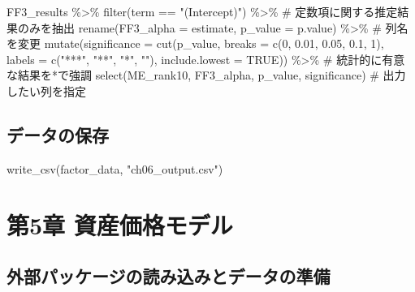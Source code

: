 \documentclass[
  letterpaper,
  DIV=11,
  numbers=noendperiod]{scrreprt}
\newenvironment{Shaded}{\begin{snugshade}}{\end{snugshade}}
\newcommand{\AttributeTok}[1]{\textcolor[rgb]{0.40,0.45,0.13}{#1}}
\newcommand{\CommentTok}[1]{\textcolor[rgb]{0.37,0.37,0.37}{#1}}
\newcommand{\ConstantTok}[1]{\textcolor[rgb]{0.56,0.35,0.01}{#1}}
\newcommand{\DecValTok}[1]{\textcolor[rgb]{0.68,0.00,0.00}{#1}}
\newcommand{\FloatTok}[1]{\textcolor[rgb]{0.68,0.00,0.00}{#1}}
\newcommand{\FunctionTok}[1]{\textcolor[rgb]{0.28,0.35,0.67}{#1}}
\newcommand{\NormalTok}[1]{\textcolor[rgb]{0.00,0.23,0.31}{#1}}
\newcommand{\SpecialCharTok}[1]{\textcolor[rgb]{0.37,0.37,0.37}{#1}}
\newcommand{\StringTok}[1]{\textcolor[rgb]{0.13,0.47,0.30}{#1}}
\begin{document}
\begin{Shaded}
\begin{Highlighting}[]
\NormalTok{FF3\_results }\SpecialCharTok{\%\textgreater{}\%} 
  \FunctionTok{filter}\NormalTok{(term }\SpecialCharTok{==} \StringTok{"(Intercept)"}\NormalTok{) }\SpecialCharTok{\%\textgreater{}\%} \CommentTok{\# 定数項に関する推定結果のみを抽出}
  \FunctionTok{rename}\NormalTok{(}\AttributeTok{FF3\_alpha =}\NormalTok{ estimate, }\AttributeTok{p\_value =}\NormalTok{ p.value) }\SpecialCharTok{\%\textgreater{}\%} \CommentTok{\# 列名を変更}
  \FunctionTok{mutate}\NormalTok{(}\AttributeTok{significance =} \FunctionTok{cut}\NormalTok{(p\_value,}
                            \AttributeTok{breaks =} \FunctionTok{c}\NormalTok{(}\DecValTok{0}\NormalTok{, }\FloatTok{0.01}\NormalTok{, }\FloatTok{0.05}\NormalTok{, }\FloatTok{0.1}\NormalTok{, }\DecValTok{1}\NormalTok{), }
                            \AttributeTok{labels =} \FunctionTok{c}\NormalTok{(}\StringTok{"***"}\NormalTok{, }\StringTok{"**"}\NormalTok{, }\StringTok{"*"}\NormalTok{, }\StringTok{""}\NormalTok{), }
                            \AttributeTok{include.lowest =} \ConstantTok{TRUE}\NormalTok{)) }\SpecialCharTok{\%\textgreater{}\%} \CommentTok{\# 統計的に有意な結果を*で強調}
  \FunctionTok{select}\NormalTok{(ME\_rank10, FF3\_alpha, p\_value, significance) }\CommentTok{\# 出力したい列を指定}
\end{Highlighting}
\end{Shaded}

\section{データの保存}\label{ux30c7ux30fcux30bfux306eux4fddux5b58-2}

\begin{Shaded}
\begin{Highlighting}[]
\FunctionTok{write\_csv}\NormalTok{(factor\_data, }\StringTok{"ch06\_output.csv"}\NormalTok{)}
\end{Highlighting}
\end{Shaded}

\chapter{第5章
資産価格モデル}\label{ux7b2c5ux7ae0-ux8cc7ux7523ux4fa1ux683cux30e2ux30c7ux30eb}

\section{外部パッケージの読み込みとデータの準備}\label{ux5916ux90e8ux30d1ux30c3ux30b1ux30fcux30b8ux306eux8aadux307fux8fbcux307fux3068ux30c7ux30fcux30bfux306eux6e96ux5099}
\end{document}
